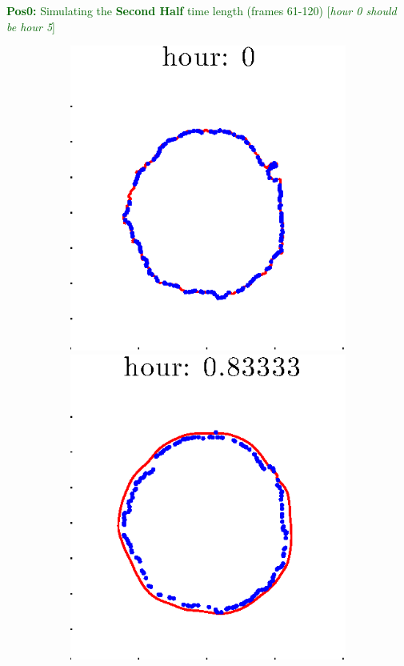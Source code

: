 \documentclass[12pt]{article}
\begin{document}
\clearpage

\noindent \textcolor{DarkGreen}{\textbf{Pos0:} Simulating the \textbf{Second Half} time length (frames 61-120) [\textit{hour 0 should be hour 5}]}

\begin{figure}[h!]
\centering
	\begin{subfigure}[b]{.3\textwidth}
	\centering
		\includegraphics[height=.15\textheight]{Pos0/secondhalf/full1.eps}
		\includegraphics[height=.15\textheight]{Pos0/secondhalf/full2.eps}

\end{subfigure}
\end{figure}
\end{document}
